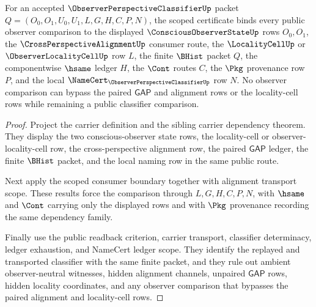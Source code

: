\begin{theorem}
\label{thm:observer-perspective-classifier-scope-certificate}
For an accepted $\ObserverPerspectiveClassifierUp$ packet $Q=(O_0,O_1,U_0,U_1,L,G,H,C,P,N)$, the scoped certificate binds every public observer comparison to the displayed $\ConsciousObserverStateUp$ rows $O_0,O_1$, the $\CrossPerspectiveAlignmentUp$ consumer route, the $\LocalityCellUp$ or $\ObserverLocalityCellUp$ row $L$, the finite $\BHist$ packet $Q$, the componentwise $\hsame$ ledger $H$, the $\Cont$ routes $C$, the $\Pkg$ provenance row $P$, and the local $\NameCert_{\ObserverPerspectiveClassifierUp}$ row $N$. No observer comparison can bypass the paired $\mathsf{GAP}$ and alignment rows or the locality-cell rows while remaining a public classifier comparison.
\end{theorem}
\begin{proof}
Project the carrier definition and the sibling carrier dependency theorem. They display the two conscious-observer state rows, the locality-cell or observer-locality-cell row, the cross-perspective alignment row, the paired $\mathsf{GAP}$ ledger, the finite $\BHist$ packet, and the local naming row in the same public route.

Next apply the scoped consumer boundary together with alignment transport scope. These results force the comparison through $L,G,H,C,P,N$, with $\hsame$ and $\Cont$ carrying only the displayed rows and with $\Pkg$ provenance recording the same dependency family.

Finally use the public readback criterion, carrier transport, classifier determinacy, ledger exhaustion, and NameCert ledger scope. They identify the replayed and transported classifier with the same finite packet, and they rule out ambient observer-neutral witnesses, hidden alignment channels, unpaired $\mathsf{GAP}$ rows, hidden locality coordinates, and any observer comparison that bypasses the paired alignment and locality-cell rows.
\end{proof}


